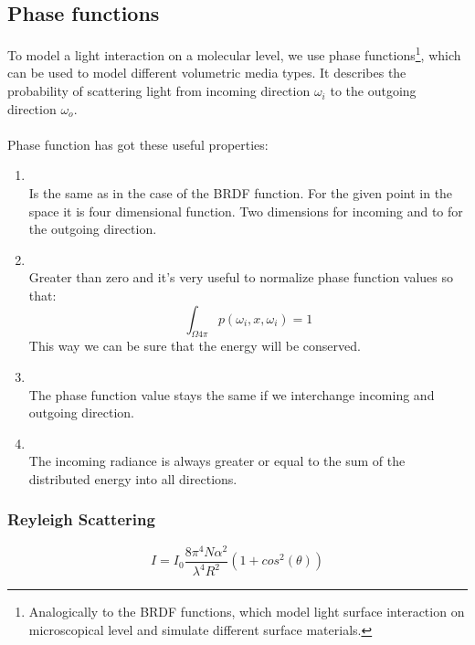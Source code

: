\subsection{Phase functions}
To model a light interaction on a molecular level, we use phase functions\footnote{Analogically to the BRDF functions, which model light surface interaction on microscopical level and simulate different surface materials.}, which can be used to model different volumetric media types. It describes the probability of scattering light from incoming direction $\omega_{i}$ to the outgoing direction $\omega_{o}$.
\\
\\
Phase function has got these useful properties:
 \begin{enumerate}
\item {}\\
Is the same as in the case of the BRDF function. For the given point in the space it is four dimensional function. Two dimensions for incoming and to for the outgoing direction.
\item {}\\
Greater than zero and it's very useful to normalize phase function values so that:
\begin{equation}
\int_{\Omega\text{4}\pi}p(\omega_{i},x,\omega_{i})=1
\end{equation}
This way we can be sure that the energy will be conserved.
\item {}\\
The phase function value stays the same if we interchange incoming and outgoing direction.
\item {}\\
The incoming radiance is always greater or equal to the sum of the distributed energy into all directions.
\end{enumerate}

\subsubsection{Reyleigh Scattering}
\begin{equation}
I=I_0\frac{8\pi^{4}N\alpha^{2}}{\lambda ^{4}R^{2}}(1+cos^{2}(\theta))
\end{equation}

